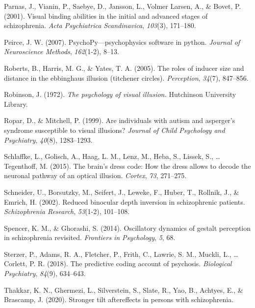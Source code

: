 \documentclass[
  english,
  man,floatsintext]{apa6}
\newlength{\cslhangindent}
\newenvironment{cslreferences}%
  {\setlength{\parindent}{0pt}%
  \everypar{\setlength{\hangindent}{\cslhangindent}}\ignorespaces}%
  {\par}
\begin{document}
\begin{cslreferences}
\leavevmode\hypertarget{ref-parnas2001visual}{}%
Parnas, J., Vianin, P., Saebye, D., Jansson, L., Volmer Larsen, A., \& Bovet, P. (2001). Visual binding abilities in the initial and advanced stages of schizophrenia. \emph{Acta Psychiatrica Scandinavica}, \emph{103}(3), 171--180.

\leavevmode\hypertarget{ref-peirce2007psychopy}{}%
Peirce, J. W. (2007). PsychoPy---psychophysics software in python. \emph{Journal of Neuroscience Methods}, \emph{162}(1-2), 8--13.

\leavevmode\hypertarget{ref-roberts2005roles}{}%
Roberts, B., Harris, M. G., \& Yates, T. A. (2005). The roles of inducer size and distance in the ebbinghaus illusion (titchener circles). \emph{Perception}, \emph{34}(7), 847--856.

\leavevmode\hypertarget{ref-robinson1972psychology}{}%
Robinson, J. (1972). \emph{The psychology of visual illusion.} Hutchinson University Library.

\leavevmode\hypertarget{ref-ropar1999individuals}{}%
Ropar, D., \& Mitchell, P. (1999). Are individuals with autism and asperger's syndrome susceptible to visual illusions? \emph{Journal of Child Psychology and Psychiatry}, \emph{40}(8), 1283--1293.

\leavevmode\hypertarget{ref-schlaffke2015brain}{}%
Schlaffke, L., Golisch, A., Haag, L. M., Lenz, M., Heba, S., Lissek, S., \ldots{} Tegenthoff, M. (2015). The brain's dress code: How the dress allows to decode the neuronal pathway of an optical illusion. \emph{Cortex}, \emph{73}, 271--275.

\leavevmode\hypertarget{ref-schneider2002reduced}{}%
Schneider, U., Borsutzky, M., Seifert, J., Leweke, F., Huber, T., Rollnik, J., \& Emrich, H. (2002). Reduced binocular depth inversion in schizophrenic patients. \emph{Schizophrenia Research}, \emph{53}(1-2), 101--108.

\leavevmode\hypertarget{ref-spencer2014oscillatory}{}%
Spencer, K. M., \& Ghorashi, S. (2014). Oscillatory dynamics of gestalt perception in schizophrenia revisited. \emph{Frontiers in Psychology}, \emph{5}, 68.

\leavevmode\hypertarget{ref-sterzer2018predictive}{}%
Sterzer, P., Adams, R. A., Fletcher, P., Frith, C., Lawrie, S. M., Muckli, L., \ldots{} Corlett, P. R. (2018). The predictive coding account of psychosis. \emph{Biological Psychiatry}, \emph{84}(9), 634--643.

\leavevmode\hypertarget{ref-thakkar2020stronger}{}%
Thakkar, K. N., Ghermezi, L., Silverstein, S., Slate, R., Yao, B., Achtyes, E., \& Brascamp, J. (2020). Stronger tilt aftereffects in persons with schizophrenia.


\end{cslreferences}
\end{document}
